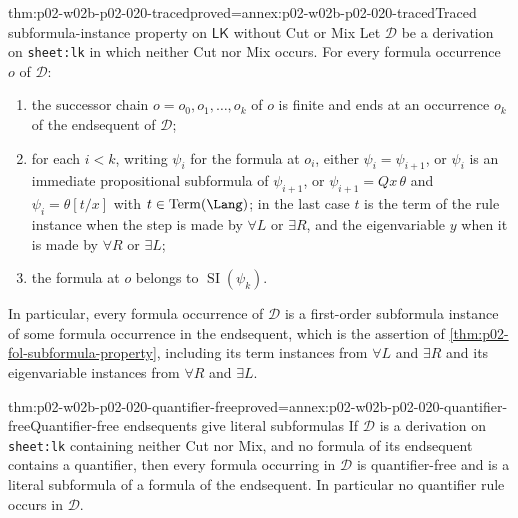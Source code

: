 \begin{hbtheorem}{thm:p02-w02b-p02-020-traced}{proved=annex:p02-w02b-p02-020-traced}{Traced subformula-instance property on \(\mathsf{LK}\) without Cut or Mix}
Let \(\mathcal D\) be a derivation on
\texttt{sheet:lk} in which neither Cut nor Mix occurs.
For every formula occurrence \(o\) of \(\mathcal D\):
\begin{enumerate}
  \item the successor chain \(o=o_0,o_1,\ldots,o_k\) of \(o\) is finite and
        ends at an occurrence \(o_k\) of the endsequent of \(\mathcal D\);
  \item for each \(i<k\), writing \(\psi_i\) for the formula at \(o_i\),
        either \(\psi_i=\psi_{i+1}\), or \(\psi_i\) is an immediate
        propositional subformula of \(\psi_{i+1}\), or
        \(\psi_{i+1}=Qx\,\theta\) and \(\psi_i=\theta[t/x]\) with
        \(t\in\operatorname{Term}(\Lang)\); in the last case \(t\) is the term
        of the rule instance when the step is made by \(\forall L\) or
        \(\exists R\), and the eigenvariable \(y\) when it is made by
        \(\forall R\) or \(\exists L\);
  \item the formula at \(o\) belongs to \(\operatorname{SI}(\psi_k)\).
\end{enumerate}
In particular, every formula occurrence of \(\mathcal D\) is a first-order
subformula instance of some formula occurrence in the endsequent, which is the
assertion of \cref{thm:p02-fol-subformula-property}, including its term
instances from \(\forall L\) and \(\exists R\) and its eigenvariable instances
from \(\forall R\) and \(\exists L\).
\end{hbtheorem}

\begin{hbcorollary}{thm:p02-w02b-p02-020-quantifier-free}{proved=annex:p02-w02b-p02-020-quantifier-free}{Quantifier-free endsequents give literal subformulas}
If \(\mathcal D\) is a derivation on \texttt{sheet:lk}
containing neither Cut nor Mix, and no formula of its endsequent contains a
quantifier, then every formula occurring in \(\mathcal D\) is quantifier-free
and is a literal subformula of a formula of the endsequent.  In particular no
quantifier rule occurs in \(\mathcal D\).
\end{hbcorollary}

